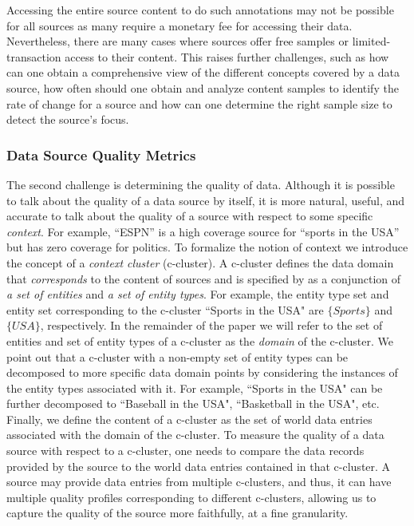 \documentclass{sig-alternate}
\begin{document}
Accessing the entire source content to do such annotations may not be possible for all sources as many require a monetary fee for accessing their data. Nevertheless, there are many cases where sources offer free samples or limited-transaction access to their content. This raises further challenges, such as how can one obtain a comprehensive view of the different concepts covered by a data source, how often should one obtain and analyze content samples to identify the rate of change for a source and how can one determine the right sample size to detect the source's focus.

\subsubsection{Data Source Quality Metrics} 
\label{sec:quality}
The second challenge is determining the quality of data. Although it is possible to talk about the quality of a data source by itself, it is more natural, useful, and accurate to talk about the quality of a source with respect to some specific {\em context}. For example, ``ESPN'' is a high coverage source for ``sports in the USA'' but has zero coverage for politics. To formalize the notion of context we introduce the concept of a {\em context cluster} (c-cluster). A c-cluster defines the data domain that {\em corresponds} to the content of sources and is specified by as a conjunction of {\em a set of entities} and {\em  a set of entity types}. For example, the entity type set and entity set corresponding to the c-cluster ``Sports in the USA" are $\{Sports\}$ and $\{USA\}$, respectively. In the remainder of the paper we will refer to the set of entities and set of entity types of a c-cluster as the {\em domain} of the c-cluster. We point out that a c-cluster with a non-empty set of entity types can be decomposed to more specific data domain points by considering the instances of the entity types associated with it. For example, ``Sports in the USA" can be further decomposed to ``Baseball in the USA", ``Basketball in the USA", etc. Finally, we define the content of a c-cluster as the set of world data entries associated with the domain of the c-cluster. To measure the quality of a data source with respect to a c-cluster, one needs to compare the data records provided by the source to the world data entries contained in that c-cluster. A source may provide data entries from multiple c-clusters, and thus, it can have multiple quality profiles corresponding to different c-clusters, allowing us to capture the quality of the source more faithfully, at a fine granularity.
\end{document}
